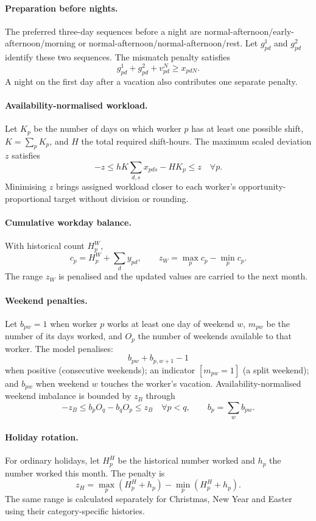 \documentclass[11pt,a4paper]{article}
\begin{document}
\paragraph{Preparation before nights.}
The preferred three-day sequences before a night are normal-afternoon/early-afternoon/morning or normal-afternoon/normal-afternoon/rest. Let $g^1_{pd}$ and $g^2_{pd}$ identify these two sequences. The mismatch penalty satisfies
\[
 g^1_{pd}+g^2_{pd}+v^{N}_{pd}\geq x_{pdN}.
\]
A night on the first day after a vacation also contributes one separate penalty.

\paragraph{Availability-normalised workload.}
Let $K_p$ be the number of days on which worker $p$ has at least one possible shift, $K=\sum_pK_p$, and $H$ the total required shift-hours. The maximum scaled deviation $z$ satisfies
\[
 -z\leq hK\sum_{d,s}x_{pds}-HK_p\leq z\quad\forall p.
\]
Minimising $z$ brings assigned workload closer to each worker's opportunity-proportional target without division or rounding.

\paragraph{Cumulative workday balance.}
With historical count $H_p^{W}$,
\[
 c_p=H_p^{W}+\sum_dy_{pd},
 \qquad z_W=\max_pc_p-\min_pc_p.
\]
The range $z_W$ is penalised and the updated values are carried to the next month.

\paragraph{Weekend penalties.}
Let $b_{pw}=1$ when worker $p$ works at least one day of weekend $w$, $m_{pw}$ be the number of its days worked, and $O_p$ the number of weekends available to that worker. The model penalises:
\[
 b_{pw}+b_{p,w+1}-1
\]
when positive (consecutive weekends); an indicator $[m_{pw}=1]$ (a split weekend); and $b_{pw}$ when weekend $w$ touches the worker's vacation. Availability-normalised weekend imbalance is bounded by $z_B$ through
\[
 -z_B\leq b_pO_q-b_qO_p\leq z_B\quad\forall p<q,
 \qquad b_p=\sum_wb_{pw}.
\]

\paragraph{Holiday rotation.}
For ordinary holidays, let $H_p^{H}$ be the historical number worked and $h_p$ the number worked this month. The penalty is
\[
 z_H=\max_p(H_p^{H}+h_p)-\min_p(H_p^{H}+h_p).
\]
The same range is calculated separately for Christmas, New Year and Easter using their category-specific histories.
\end{document}
